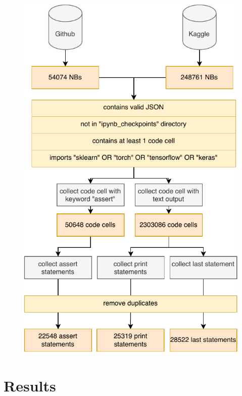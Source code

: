 \documentclass[sigconf]{acmart}
\begin{document}
\begin{figure}
  \centering
  \includegraphics[width=\linewidth]{esem24-method.pdf}
\end{figure}
\section{Results}

\end{document}
